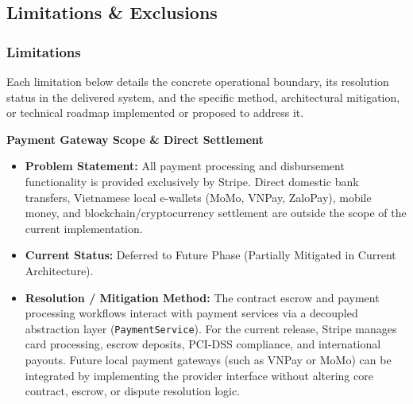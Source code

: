 \subsection{Limitations \& Exclusions}

\subsubsection{Limitations}

Each limitation below details the concrete operational boundary, its resolution status in the delivered system, and the specific method, architectural mitigation, or technical roadmap implemented or proposed to address it.

\begin{description}[leftmargin=2.0cm,labelwidth=1.8cm,align=left,font=\normalfont\bfseries]

\item[LI-01] \textbf{Payment Gateway Scope \& Direct Settlement}
\begin{itemize}[leftmargin=0.5cm, label=--]
\item \textbf{Problem Statement:} All payment processing and disbursement functionality is provided exclusively by Stripe. Direct domestic bank transfers, Vietnamese local e-wallets (MoMo, VNPay, ZaloPay), mobile money, and blockchain/cryptocurrency settlement are outside the scope of the current implementation.
\item \textbf{Current Status:} Deferred to Future Phase (Partially Mitigated in Current Architecture).
\item \textbf{Resolution / Mitigation Method:} The contract escrow and payment processing workflows interact with payment services via a decoupled abstraction layer (\texttt{PaymentService}). For the current release, Stripe manages card processing, escrow deposits, PCI-DSS compliance, and international payouts. Future local payment gateways (such as VNPay or MoMo) can be integrated by implementing the provider interface without altering core contract, escrow, or dispute resolution logic.
\end{itemize}


\end{description}
